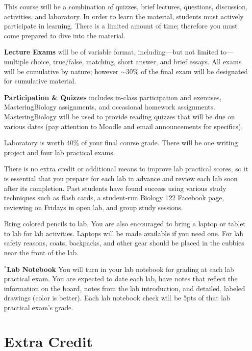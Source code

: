 \documentclass{tufte-handout}
\begin{document}
\begin{fullwidth}





This course will be a combination of quizzes, brief lectures, questions, discussion, activities, and laboratory. In order to learn the material, students must actively participate in learning. There is a limited amount of time; therefore you must come prepared to dive into the material. 


\textbf{{Lecture Exams}} will be of variable format, including---but not limited to---multiple choice, true/false, matching, short answer, and brief essays. All exams will be cumulative by nature; however $\sim$30\% of the final exam will be designated for cumulative material. 

\textbf{{Participation \& Quizzes}} includes in-class participation and exercises, MasteringBiology assignments, and occasional homework assignments. MasteringBiology will be used to provide reading quizzes that will be due on various dates (pay attention to Moodle and email announcements for specifics). 


{{Laboratory}} is worth 40\% of your final course grade. There will be one writing project and four lab practical exams. 

There is no extra credit or additional means to improve lab practical scores, so it is essential that you prepare for each lab in advance and review each lab soon after its completion. Past students have found success using various study techniques such as flash cards, a student-run Biology 122 Facebook page, reviewing on Fridays in open lab, and group study sessions. 

Bring colored pencils to lab. You are also encouraged to bring a laptop or tablet to lab for lab activities. Laptops will be made available if you need one. For lab safety reasons, coats, backpacks, and other gear should be placed in the cubbies near the front of the lab. 

{\textbf{$^*$Lab Notebook}} You will turn in your lab notebook for grading at each lab practical exam. You are expected to date each lab, have notes that reflect the information on the board, notes from the lab introduction, and detailed, labeled drawings (color is better). Each lab notebook check will be 5pts of that lab practical exam's grade. 

\section{Extra Credit}


\end{fullwidth}
\end{document}
